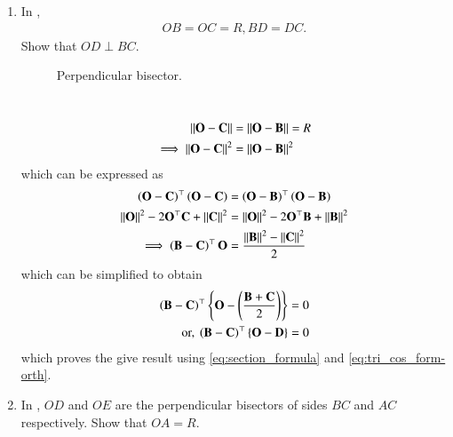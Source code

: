 \begin{enumerate}[label=\thesection.\arabic*.,ref=\thesection.\theenumi]
\item In 
	\label{prob:tri-ccentre-def}
	, 
\begin{align}
OB = OC=R, 	BD = DC.
\end{align}
Show that $OD \perp BC$.
%
\begin{figure}[!ht]
	\begin{center}
		
		\resizebox{0.6\columnwidth}{!}{}
	\end{center}
	\caption{Perpendicular bisector.}
	\label{fig:tri-perp-bis}	
\end{figure}
\\
\solution 
\begin{align}
	\left\lVert\mathbf{O}-\mathbf{C}\right\rVert &=
\left\lVert\mathbf{O}-\mathbf{B}\right\rVert =R
\\
	\implies \left\lVert\mathbf{O}-\mathbf{C}\right\rVert^2 &=
\left\lVert\mathbf{O}-\mathbf{B}\right\rVert^2 
\end{align}
which can be expressed as 
\begin{align}
	\left(\mathbf{O}-\mathbf{C}\right)^{\top} \left(\mathbf{O}-\mathbf{C}\right)&=
	\left(\mathbf{O}-\mathbf{B}\right)^{\top} 
\left(\mathbf{O}-\mathbf{B}\right)
\\
\left\lVert\mathbf{O}\right\rVert^2-2{\mathbf{O}}^{\top}\mathbf{C} + \left\lVert\mathbf{C}\right\rVert^2
	&= \left\lVert\mathbf{O}\right\rVert^2-2{\mathbf{O}}^{\top}\mathbf{B} + \left\lVert\mathbf{B}\right\rVert^2
	\\
	\implies 
	  \left(\mathbf{B}-\mathbf{C}\right)^{\top}{\mathbf{O}} 
	  &=  \frac{\left\lVert\mathbf{B}\right\rVert^2 - \left\lVert\mathbf{C}\right\rVert^2}{2}
\end{align}
which can be simplified to obtain
  \begin{align}
	  \left(\mathbf{B}-\mathbf{C}\right)^{\top}\left\{{\mathbf{O}}- 
	    \left(\frac{{\mathbf{B}} + {\mathbf{C}}}{2}\right)\right\}=0
  \label{eq:norm2d_equidist}
  \\
	  \text{or, }
	  \left(\mathbf{B}-\mathbf{C}\right)^{\top}\left\{{\mathbf{O}}- \mathbf{D}\right\}=0
  \label{eq:norm2d_equidist-conv}
  \end{align}
  which proves the give result using 
	  \eqref{eq:section_formula}
	  and 
\eqref{eq:tri_cos_form-orth}.
\item In 
	,
$OD$ and $OE$ are the perpendicular bisectors of sides $BC$ and $AC$ respectively.  Show that 
$OA = R$.
\begin{figure}[!ht]
	\begin{center}
		

\end{center}
\end{figure}
\end{enumerate}
